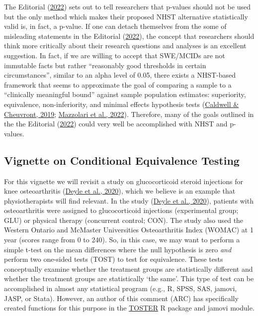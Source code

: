 \documentclass[]{cik}%
\begin{document}
The Editorial (\protect\hyperlink{ref-elkins2022}{2022}) sets out to
tell researchers that p-values should not be used but the only method
which makes their proposed NHST alternative statistically valid is, in
fact, a p-value. If one can detach themselves from the some of
misleading statements in the Editorial
(\protect\hyperlink{ref-elkins2022}{2022}), the concept that researchers
should think more critically about their research questions and analyses
is an excellent suggestion. In fact, if we are willing to accept that
SWE/MCIDs are not immutable facts but rather ``reasonably good
thresholds in certain circumstances'', similar to an alpha level of
0.05, there exists a NHST-based framework that seems to approximate the
goal of comparing a sample to a ``clinically meaningful bound'' against
sample population estimates: superiority, equivalence, non-inferiority,
and minimal effects hypothesis tests
(\protect\hyperlink{ref-caldwell2019}{Caldwell \& Cheuvront, 2019};
\protect\hyperlink{ref-mazzolari2022}{Mazzolari et al., 2022}).
Therefore, many of the goals outlined in the the Editorial
(\protect\hyperlink{ref-elkins2022}{2022}) could very well be
accomplished with NHST and p-values.

\hypertarget{vignette-on-conditional-equivalence-testing}{%
\subsection{Vignette on Conditional Equivalence
Testing}\label{vignette-on-conditional-equivalence-testing}}

For this vignette we will revisit a study on glucocorticoid steroid
injections for knee osteoarthritis (\protect\hyperlink{ref-vigex}{Deyle
et al., 2020}), which we believe is an example that physiotherapists
will find relevant. In the study (\protect\hyperlink{ref-vigex}{Deyle et
al., 2020}), patients with osteoarthritis were assigned to
glucocorticoid injections (experimental group; GLU) or physical therapy
(concurrent control; CON). The study also used the Western Ontario and
McMaster Universities Osteoarthritis Index (WOMAC) at 1 year (scores
range from 0 to 240). So, in this case, we may want to perform a simple
t-test on the mean differences where the null hypothesis is zero
\emph{and} perform two one-sided tests (TOST) to test for equivalence.
These tests conceptually examine whether the treatment groups are
statistically different and whether the treatment groups are
statistically `the same'. This type of test can be accomplished in
almost any statistical program (e.g., R, SPSS, SAS, jamovi, JASP, or
Stata). However, an author of this comment (ARC) has specifically
created functions for this purpose in the
\href{https://aaroncaldwell.us/TOSTERpkg}{TOSTER} R package and jamovi
module.
\end{document}
